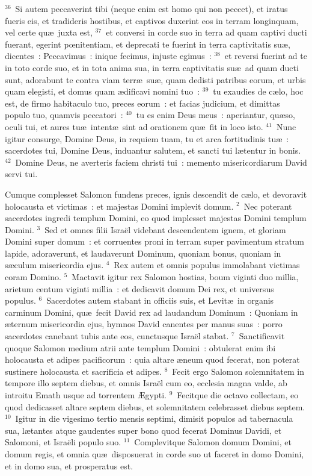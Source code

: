 ${}^{36}$~Si autem peccaverint tibi (neque enim est homo qui non peccet), et iratus fueris eis, et tradideris hostibus, et captivos duxerint eos in terram longinquam, vel certe qu\ae\ juxta est,
${}^{37}$~et conversi in corde suo in terra ad quam captivi ducti fuerant, egerint pœnitentiam, et deprecati te fuerint in terra captivitatis su\ae , dicentes~: Peccavimus~: inique fecimus, injuste egimus~:
${}^{38}$~et reversi fuerint ad te in toto corde suo, et in tota anima sua, in terra captivitatis su\ae\ ad quam ducti sunt, adorabunt te contra viam terr\ae\ su\ae , quam dedisti patribus eorum, et urbis quam elegisti, et domus quam \ae dificavi nomini tuo~:
${}^{39}$~tu exaudies de c\ae lo, hoc est, de firmo habitaculo tuo, preces eorum~: et facias judicium, et dimittas populo tuo, quamvis peccatori~:
${}^{40}$~tu es enim Deus meus~: aperiantur, qu\ae so, oculi tui, et aures tu\ae\ intent\ae\ sint ad orationem qu\ae\ fit in loco isto.
${}^{41}$~Nunc igitur consurge, Domine Deus, in requiem tuam, tu et arca fortitudinis tu\ae~: sacerdotes tui, Domine Deus, induantur salutem, et sancti tui l\ae tentur in bonis.
${}^{42}$~Domine Deus, ne averteris faciem christi tui~: memento misericordiarum David servi tui.

\lettrine[lines=10,image=true,loversize=0.05,lraise=-0.03]{C}{}umque complesset Salomon fundens preces, ignis descendit de c\ae lo, et devoravit holocausta et victimas~: et majestas Domini implevit domum.
${}^{2}$~Nec poterant sacerdotes ingredi templum Domini, eo quod implesset majestas Domini templum Domini.
${}^{3}$~Sed et omnes filii Isra\"el videbant descendentem ignem, et gloriam Domini super domum~: et corruentes proni in terram super pavimentum stratum lapide, adoraverunt, et laudaverunt Dominum, quoniam bonus, quoniam in s\ae culum misericordia ejus.
${}^{4}$~Rex autem et omnis populus immolabant victimas coram Domino.
${}^{5}$~Mactavit igitur rex Salomon hostias, boum viginti duo millia, arietum centum viginti millia~: et dedicavit domum Dei rex, et universus populus.
${}^{6}$~Sacerdotes autem stabant in officiis suis, et Levit\ae\ in organis carminum Domini, qu\ae\ fecit David rex ad laudandum Dominum~: Quoniam in \ae ternum misericordia ejus, hymnos David canentes per manus suas~: porro sacerdotes canebant tubis ante eos, cunctusque Isra\"el stabat.
${}^{7}$~Sanctificavit quoque Salomon medium atrii ante templum Domini~: obtulerat enim ibi holocausta et adipes pacificorum~: quia altare \ae neum quod fecerat, non poterat sustinere holocausta et sacrificia et adipes.
${}^{8}$~Fecit ergo Salomon solemnitatem in tempore illo septem diebus, et omnis Isra\"el cum eo, ecclesia magna valde, ab introitu Emath usque ad torrentem \AE gypti.
${}^{9}$~Fecitque die octavo collectam, eo quod dedicasset altare septem diebus, et solemnitatem celebrasset diebus septem.
${}^{10}$~Igitur in die vigesimo tertio mensis septimi, dimisit populos ad tabernacula sua, l\ae tantes atque gaudentes super bono quod fecerat Dominus Davidi, et Salomoni, et Isra\"eli populo suo.
${}^{11}$~Complevitque Salomon domum Domini, et domum regis, et omnia qu\ae\ disposuerat in corde suo ut faceret in domo Domini, et in domo sua, et prosperatus est.


